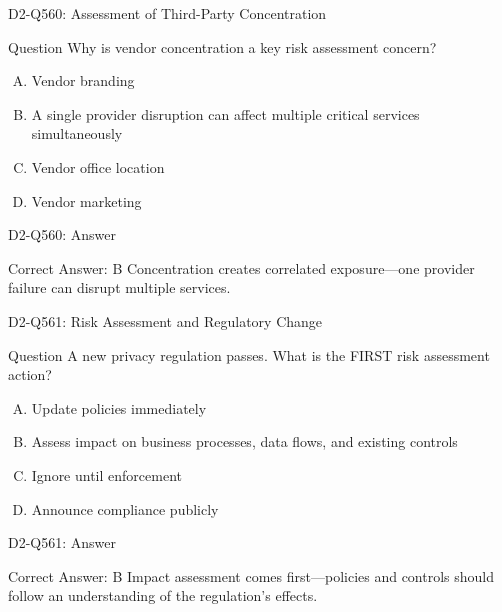 \documentclass{beamer}
\begin{document}
	\begin{frame}{D2-Q560: Assessment of Third-Party Concentration}
		\begin{block}{Question}
			Why is vendor concentration a key risk assessment concern?
		\end{block}
		\begin{enumerate}[(A)]
			\item Vendor branding
			\item A single provider disruption can affect multiple critical services simultaneously
			\item Vendor office location
			\item Vendor marketing
		\end{enumerate}
	\end{frame}
	\begin{frame}{D2-Q560: Answer}
		\begin{block}{Correct Answer: B}
			Concentration creates correlated exposure—one provider failure can disrupt multiple services.
		\end{block}
	\end{frame}
	
	\begin{frame}{D2-Q561: Risk Assessment and Regulatory Change}
		\begin{block}{Question}
			A new privacy regulation passes. What is the FIRST risk assessment action?
		\end{block}
		\begin{enumerate}[(A)]
			\item Update policies immediately
			\item Assess impact on business processes, data flows, and existing controls
			\item Ignore until enforcement
			\item Announce compliance publicly
		\end{enumerate}
	\end{frame}
	\begin{frame}{D2-Q561: Answer}
		\begin{block}{Correct Answer: B}
			Impact assessment comes first—policies and controls should follow an understanding of the regulation's effects.
		\end{block}
	\end{frame}
	
\end{document}
